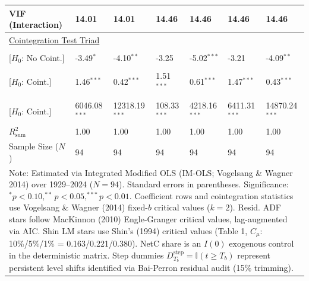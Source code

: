 \begin{table}[H]
\begin{tabular}{p{3.8cm}p{2.1cm}p{2.1cm}p{2.1cm}p{2.1cm}p{2.1cm}p{2.1cm}}
VIF (Interaction) & 14.01 & 14.01 & 14.46 & 14.46 & 14.46 & 14.46  \\
\midrule
\multicolumn{7}{l}{\underline{Cointegration Test Triad}} \\
\makecell[l]{Resid. ADF ($t_{\text{ADF}}$) \\ {\scriptsize [$H_0$: No Coint.]}} & -3.49$^{*}$ & -4.10$^{**}$ & -3.25 & -5.02$^{***}$ & -3.21 & -4.09$^{**}$  \\
\makecell[l]{Shin LM ($C_{\text{Shin}}$) \\ {\scriptsize [$H_0$: Coint.]}} & 1.46$^{***}$ & 0.42$^{***}$ & 1.51$^{***}$ & 0.61$^{***}$ & 1.47$^{***}$ & 0.43$^{***}$  \\
\makecell[l]{VW Type 2 ($S_{\text{Type 2}}$) \\ {\scriptsize [$H_0$: Coint.]}} & 6046.08$^{***}$ & 12318.19$^{***}$ & 108.33$^{***}$ & 4218.16$^{***}$ & 6411.31$^{***}$ & 14870.24$^{***}$  \\
\midrule
$R^2_{\text{sum}}$ & 1.00 & 1.00 & 1.00 & 1.00 & 1.00 & 1.00  \\
Sample Size ($N$) & 94 & 94 & 94 & 94 & 94 & 94  \\
\bottomrule
\multicolumn{7}{p{16.5cm}}{\footnotesize Note: Estimated via Integrated Modified OLS (IM-OLS; Vogelsang \& Wagner 2014) over 1929--2024 ($N=94$). Standard errors in parentheses. Significance: $^*p<0.10, ^{**}p<0.05, ^{***}p<0.01$. Coefficient rows and cointegration statistics use Vogelsang \& Wagner (2014) fixed-$b$ critical values ($k=2$). Resid. ADF stars follow MacKinnon (2010) Engle-Granger critical values, lag-augmented via AIC. Shin LM stars use Shin's (1994) critical values (Table 1, $C_\mu$: 10\%/5\%/1\% = 0.163/0.221/0.380). NetC share is an $I(0)$ exogenous control in the deterministic matrix. Step dummies $D^{\text{step}}_{T_b} = \mathbb{I}(t \ge T_b)$ represent persistent level shifts identified via Bai-Perron residual audit (15\% trimming).}
\end{tabular}
\end{table}
